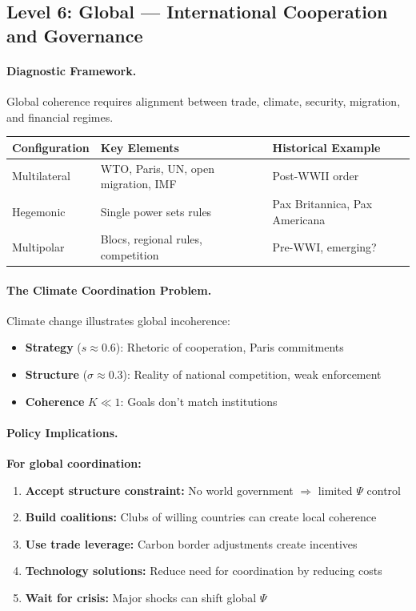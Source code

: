 \documentclass[12pt,a4paper]{article}
\begin{document}
\subsection{Level 6: Global --- International Cooperation and Governance}

\paragraph{Diagnostic Framework.}
Global coherence requires alignment between trade, climate, security,
migration, and financial regimes.

\begin{center}
\renewcommand{\arraystretch}{1.2}
\begin{tabular}{lll}
\hline
\textbf{Configuration} & \textbf{Key Elements} & \textbf{Historical Example} \\
\hline
Multilateral & WTO, Paris, UN, open migration, IMF & Post-WWII order \\
Hegemonic & Single power sets rules & Pax Britannica, Pax Americana \\
Multipolar & Blocs, regional rules, competition & Pre-WWI, emerging? \\
\hline
\end{tabular}
\end{center}

\paragraph{The Climate Coordination Problem.}
Climate change illustrates global incoherence:
\begin{itemize}
  \item \textbf{Strategy} ($s \approx 0.6$): Rhetoric of cooperation, Paris commitments
  \item \textbf{Structure} ($\sigma \approx 0.3$): Reality of national competition, weak enforcement
  \item \textbf{Coherence} $K \ll 1$: Goals don't match institutions
\end{itemize}

\paragraph{Policy Implications.}
\textbf{For global coordination:}
\begin{enumerate}
  \item \textbf{Accept structure constraint:} No world government $\Rightarrow$ limited $\Psi$ control
  \item \textbf{Build coalitions:} Clubs of willing countries can create local coherence
  \item \textbf{Use trade leverage:} Carbon border adjustments create incentives
  \item \textbf{Technology solutions:} Reduce need for coordination by reducing costs
  \item \textbf{Wait for crisis:} Major shocks can shift global $\Psi$
\end{enumerate}
\end{document}
